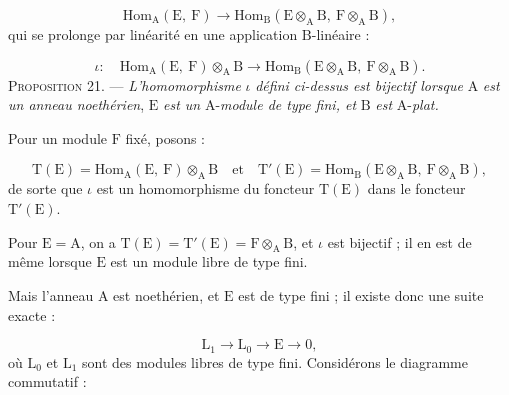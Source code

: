 \begin{equation*}
\mathrm{Hom}_\mathrm{A}(\mathrm{E},\ \mathrm{F}) \to \mathrm{Hom}_\mathrm{B}(\mathrm{E} \otimes_\mathrm{A} \mathrm{B},\ \mathrm{F} \otimes_\mathrm{A} \mathrm{B}),
\end{equation*}
qui se prolonge par linéarité en une application $\mathrm{B}$-linéaire :

\begin{equation*}
\iota : \quad \mathrm{Hom}_\mathrm{A}(\mathrm{E},\ \mathrm{F}) \otimes_\mathrm{A} \mathrm{B} \to \mathrm{Hom}_\mathrm{B}(\mathrm{E} \otimes_\mathrm{A} \mathrm{B},\ \mathrm{F} \otimes_\mathrm{A} \mathrm{B}).
\end{equation*}
\textsc{Proposition} 21. --- \textit{L'homomorphisme} $\iota$ \textit{défini ci-dessus est bijectif lorsque} $\mathrm{A}$ \textit{est un anneau noethérien}, $\mathrm{E}$ \textit{est un} $\mathrm{A}$-\textit{module de type fini, et} $\mathrm{B}$ \textit{est} $\mathrm{A}$-\textit{plat.}

Pour un module $\mathrm{F}$ fixé, posons :

\begin{equation*}
\mathrm{T}(\mathrm{E}) = \mathrm{Hom}_\mathrm{A}(\mathrm{E},\ \mathrm{F}) \otimes_\mathrm{A} \mathrm{B} \quad \text{et} \quad \mathrm{T}'(\mathrm{E}) = \mathrm{Hom}_\mathrm{B}(\mathrm{E} \otimes_\mathrm{A} \mathrm{B},\ \mathrm{F} \otimes_\mathrm{A} \mathrm{B}),
\end{equation*}
de sorte que $\iota$ est un homomorphisme du foncteur $\mathrm{T}(\mathrm{E})$ dans le foncteur $\mathrm{T}'(\mathrm{E})$.

Pour $\mathrm{E} = \mathrm{A}$, on a $\mathrm{T}(\mathrm{E}) = \mathrm{T}'(\mathrm{E}) = \mathrm{F} \otimes_\mathrm{A} \mathrm{B}$, et $\iota$ est bijectif ; il en est de même lorsque $\mathrm{E}$ est un module libre de type fini.

Mais l'anneau $\mathrm{A}$ est noethérien, et $\mathrm{E}$ est de type fini ; il existe donc une suite exacte :

\begin{equation*}
\mathrm{L}_1 \to \mathrm{L}_0 \to \mathrm{E} \to 0,
\end{equation*}
où $\mathrm{L}_0$ et $\mathrm{L}_1$ sont des modules libres de type fini. Considérons le %
diagramme commutatif :

